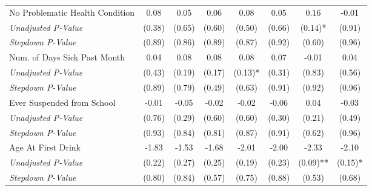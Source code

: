 \begin{tabular}{l c c c c c c c}
No Problematic Health Condition & 0.08 & 0.05 & 0.06 & 0.08 & 0.05 & 0.16 & -0.01 \\
\quad \textit{Unadjusted P-Value} & (0.38) & (0.65) & (0.60) & (0.50) & (0.66) & (0.14)* & (0.91) \\
\quad \textit{Stepdown P-Value} & (0.89) & (0.86) & (0.89) & (0.87) & (0.92) & (0.60) & (0.96) \\
Num. of Days Sick Past Month & 0.04 & 0.08 & 0.08 & 0.08 & 0.07 & -0.01 & 0.04 \\
\quad \textit{Unadjusted P-Value} & (0.43) & (0.19) & (0.17) & (0.13)* & (0.31) & (0.83) & (0.56) \\
\quad \textit{Stepdown P-Value} & (0.89) & (0.79) & (0.49) & (0.63) & (0.91) & (0.92) & (0.96) \\
Ever Suspended from School & -0.01 & -0.05 & -0.02 & -0.02 & -0.06 & 0.04 & -0.03 \\
\quad \textit{Unadjusted P-Value} & (0.76) & (0.29) & (0.60) & (0.60) & (0.30) & (0.21) & (0.49) \\
\quad \textit{Stepdown P-Value} & (0.93) & (0.84) & (0.81) & (0.87) & (0.91) & (0.62) & (0.96) \\
Age At First Drink & -1.83 & -1.53 & -1.68 & -2.01 & -2.00 & -2.33 & -2.10 \\
\quad \textit{Unadjusted P-Value} & (0.22) & (0.27) & (0.25) & (0.19) & (0.23) & (0.09)** & (0.15)* \\
\quad \textit{Stepdown P-Value} & (0.80) & (0.84) & (0.57) & (0.75) & (0.88) & (0.53) & (0.68) \\
\bottomrule
\end{tabular}
